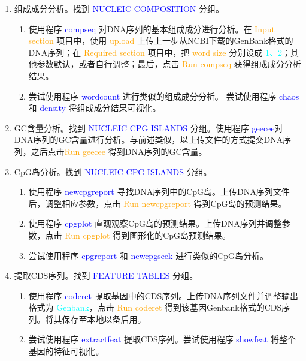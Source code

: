 \begin{description}
\begin{enumerate}
				\begin{enumerate}
					\item 组成成分分析。找到 \textcolor{blue}{NUCLEIC COMPOSITION} 分组。
						\begin{enumerate}
							\item 使用程序 \textcolor{blue}{compseq} 对DNA序列的基本组成成分进行分析。在 \textcolor{orange}{Input section} 项目中，使用 \textcolor{orange}{upload} 上传上一步从NCBI下载的GenBank格式的DNA序列；在 \textcolor{orange}{Required section} 项目中，把 \textcolor{orange}{word size} 分别设成 \textcolor{cyan}{1、2}；其他参数默认，或者自行调整；最后，点击 \textcolor{orange}{Run compseq} 获得组成成分分析结果。
							\item 尝试使用程序 \textcolor{blue}{wordcount} 进行类似的组成成分分析。 尝试使用程序 \textcolor{blue}{chaos} 和 \textcolor{blue}{density} 将组成成分结果可视化。
						\end{enumerate}
					\item GC含量分析。找到 \textcolor{blue}{NUCLEIC CPG ISLANDS} 分组。使用程序 \textcolor{blue}{geecee}对DNA序列的GC含量进行分析。与前述类似，以上传文件的方式提交DNA序列，之后点击\textcolor{orange}{Run geecee} 得到DNA序列的GC含量。
					\item CpG岛分析。找到 \textcolor{blue}{NUCLEIC CPG ISLANDS} 分组。
						\begin{enumerate}
							\item 使用程序 \textcolor{blue}{newcpgreport} 寻找DNA序列中的CpG岛。上传DNA序列文件后，调整相应参数，点击 \textcolor{orange}{Run newcpgreport} 得到CpG岛的预测结果。
							\item 使用程序 \textcolor{blue}{cpgplot} 直观观察CpG岛的预测结果。上传DNA序列并调整参数，点击 \textcolor{orange}{Run cpgplot} 得到图形化的CpG岛预测结果。
							\item 尝试使用程序 \textcolor{blue}{cpgreport} 和 \textcolor{blue}{newcpgseek} 进行类似的CpG岛分析。
						\end{enumerate}
					\item 提取CDS序列。找到 \textcolor{blue}{FEATURE TABLES} 分组。
						\begin{enumerate}
							\item 使用程序 \textcolor{blue}{coderet} 提取基因中的CDS序列。上传DNA序列文件并调整输出格式为 \textcolor{cyan}{Genbank}，点击 \textcolor{orange}{Run coderet} 得到该基因Genbank格式的CDS序列。将其保存至本地以备后用。
							\item 尝试使用程序 \textcolor{blue}{extractfeat} 提取CDS序列。尝试使用程序 \textcolor{blue}{showfeat} 将整个基因的特征可视化。

\end{enumerate}
\end{enumerate}
\end{enumerate}
\end{description}

